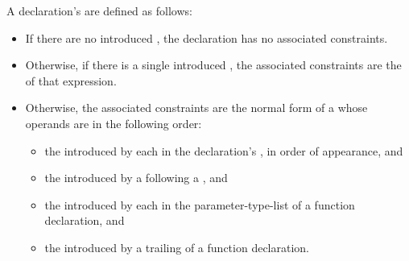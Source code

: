 \pnum
{}%
A declaration's  are defined as follows:

\begin{itemize}
\item If there are no introduced ,
the declaration has no associated constraints.

\item Otherwise, if there is a single introduced ,
the associated constraints are the 
of that expression.

\item Otherwise, the associated constraints are the normal form of a  whose operands are in the
following order:
\begin{itemize}
\item
the  introduced by
each  in
the declaration's ,
in order of appearance, and

\item
the  introduced by
a  following
a , and

\item
the  introduced by
each  in
the parameter-type-list of a function declaration, and

\item
the  introduced by
a trailing  of
a function declaration.
\end{itemize}
\end{itemize}

